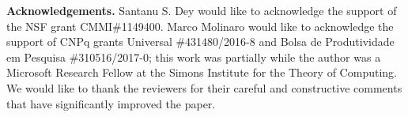 \documentclass[11pt]{article}
\newcommand{\R}{\mathbb{R}}
\newtheorem{theorem}{Theorem}
\newcommand{\cred}{\color{black}}
\begin{document}
		
\textbf{Acknowledgements.} 
Santanu S. Dey would like to acknowledge the support of the NSF grant CMMI\#1149400. Marco Molinaro would like to acknowledge the support of CNPq grants Universal \#431480/2016-8 and Bolsa de Produtividade em Pesquisa \#310516/2017-0; this work was partially while the author was a Microsoft Research Fellow at the Simons Institute for the Theory of Computing. {\cred We would like to thank the reviewers for their careful and constructive comments that have significantly improved the paper.}

\newpage
\end{document}
